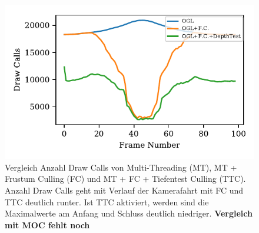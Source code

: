 \documentclass[journal]{vgtc}
\begin{document}
\begin{figure}
	\begin{minipage}{0.4\textwidth}
		\includegraphics[width=1\textwidth]{images/Evaluation_7_Results_OGL_Draw Calls.pdf}
	\end{minipage}
	\begin{minipage}{0.4\textwidth}
		\centering
	\end{minipage}
	\caption{Vergleich Anzahl Draw Calls von Multi-Threading (MT), MT + Frustum Culling (FC) und MT + FC + Tiefentest Culling (TTC). Anzahl Draw Calls geht mit Verlauf der Kamerafahrt mit FC und TTC deutlich runter. Ist TTC aktiviert, werden sind die Maximalwerte am Anfang und Schluss deutlich niedriger. \textbf{Vergleich mit MOC fehlt noch}}
	\label{fig:OGL_MOC_frustum_culling}
\end{figure}
\end{document}

